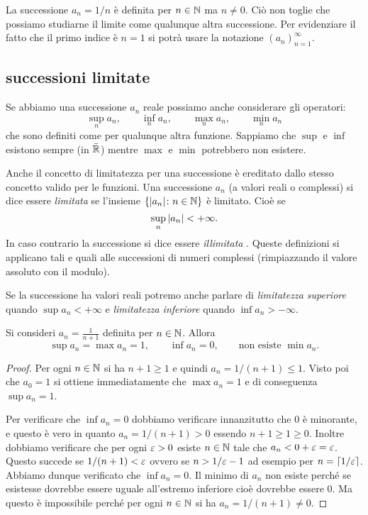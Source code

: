 \begin{example}
  La successione $a_n = 1/n$ è definita per $n\in {\mathbb N}$ ma $n\neq 0$.
  Ciò non toglie che possiamo studiarne il limite come qualunque altra
  successione. Per evidenziare il fatto che il primo indice è $n=1$
  si potrà usare la notazione $(a_n)_{n=1}^\infty$.
\end{example}
 
\subsection{successioni limitate}

Se abbiamo una successione $a_n$ reale possiamo anche considerare gli operatori:
\[
  \sup_n a_n, \qquad 
  \inf_n a_n, \qquad 
  \max_n a_n, \qquad 
  \min_n a_n 
\]
che sono definiti come per qualunque altra funzione. 
Sappiamo che $\sup$ e $\inf$ esistono sempre (in $\bar{{\mathbb R}}$) mentre $\max$ e $\min$
potrebbero non esistere.

Anche il concetto di limitatezza per una successione è ereditato dallo stesso 
concetto valido per le funzioni.
Una successione $a_n$ (a valori reali o complessi) si dice essere 
\emph{limitata}%
%
 se 
l'insieme $\{{\left|a_n\right|}\colon n \in {\mathbb N}\}$ è limitato. Cioè se 
\[
\sup_n {\left|a_n\right|} < +\infty.  
\]
In caso contrario la successione si dice essere \emph{illimitata}%
%
.
Queste definizioni si applicano tali e quali alle successioni di numeri 
complessi (rimpiazzando il valore assoluto con il modulo).

Se la successione ha valori reali potremo anche parlare di 
\emph{limitatezza superiore} quando $\sup a_n <+\infty$ 
e \emph{limitatezza inferiore} quando $\inf a_n > -\infty$.


\begin{example}
Si consideri $a_n = \frac{1}{n+1}$ definita per $n\in {\mathbb N}$.
Allora
\[
  \sup a_n = \max a_n = 1, \qquad
  \inf a_n = 0, \qquad \text{non esiste }\min a_n.
\]
\end{example}
\begin{proof}
Per ogni $n \in {\mathbb N}$ si ha $n+1\ge 1$ e quindi $a_n = 1/(n+1) \le 1$.
Visto poi che $a_0 = 1$ si ottiene immediatamente che $\max a_n = 1$
e di conseguenza $\sup a_n = 1$.

Per verificare che $\inf a_n = 0$ dobbiamo verificare innanzitutto
che $0$ è minorante, e questo è vero in quanto $a_n = 1/(n+1)> 0$ essendo $n+1\ge 1 \ge 0$.
Inoltre dobbiamo verificare che per ogni $\varepsilon >0$ esiste $n\in {\mathbb N}$ tale
che $a_n < 0 + \varepsilon = \varepsilon$. Questo succede se $1/(n+1) < \varepsilon$ ovvero
se $n > 1/\varepsilon -1$ ad esempio per $n=\lceil 1/\varepsilon\rceil$.
Abbiamo dunque verificato che $\inf a_n = 0$.
Il minimo di $a_n$ non esiste perché se esistesse dovrebbe essere uguale
all'estremo inferiore cioè dovrebbe essere $0$. Ma questo è impossibile
perché per ogni $n\in {\mathbb N}$ si ha $a_n = 1/(n+1)\neq 0$.
\end{proof}

